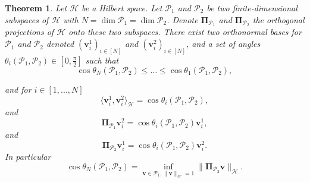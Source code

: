 \documentclass[twoside,11pt]{book}
\newtheorem{theorem}{Theorem}
\numberwithin{theorem}{chapter}
\numberwithin{definition}{chapter}
\numberwithin{proposition}{chapter}
\numberwithin{corollary}{chapter}
\numberwithin{example}{chapter}
\numberwithin{lemma}{chapter}
\numberwithin{assumption}{chapter}
\begin{document}
\begin{theorem}\label{prop:cos_between_subspaces}
Let $\mathcal{H}$ be a Hilbert space. Let $\mathcal{P}_{1}$ and $\mathcal{P}_{2}$ be two finite-dimensional subspaces of $\mathcal{H}$ with $N = \dim \mathcal{P}_{1} = \dim \mathcal{P}_{2}$. Denote $\bm{\Pi}_{\mathcal{P}_{1}}$ and $\bm{\Pi}_{\mathcal{P}_{2}}$ the orthogonal projections of $\mathcal{H}$ onto these two subspaces. There exist two orthonormal bases for $\mathcal{P}_{1}$ and $\mathcal{P}_{2}$ denoted $(\bm{v}_{i}^{1})_{i \in [N]}$ and $(\bm{v}_{i}^{2})_{i \in [N]}$, and a set of angles $\theta_{i}(\mathcal{P}_{1},\mathcal{P}_{2}) \in [0,\frac{\pi}{2}]$ such that
\begin{equation}
\cos \theta_{N}(\mathcal{P}_{1},\mathcal{P}_{2}) \leq \dots \leq \cos \theta_{1}(\mathcal{P}_{1},\mathcal{P}_{2}) ,
\end{equation}

and for $i \in [1,...,N]$
\begin{equation}
\langle \bm{v}_{i}^{1}, \bm{v}_{i}^{2} \rangle_{\mathcal{H}} = \cos \theta_{i}(\mathcal{P}_{1},\mathcal{P}_{2}),
\end{equation}
and
\begin{equation}\label{eq:principal_vectors_projection_relationship}
 \bm{\Pi}_{\mathcal{P}_{1}}\bm{v}_{i}^{2} = \cos \theta_{i}(\mathcal{P}_{1},\mathcal{P}_{2}) \bm{v}_{i}^{1},
\end{equation}
and
\begin{equation}
 \bm{\Pi}_{\mathcal{P}_{2}}\bm{v}_{i}^{1} = \cos \theta_{i}(\mathcal{P}_{1},\mathcal{P}_{2}) \bm{v}_{i}^{2}.
\end{equation}
In particular
\begin{equation}\label{eq:costhetaN}
\cos \theta_{N}(\mathcal{P}_{1},\mathcal{P}_{2}) = \inf\limits_{\bm{v} \in \mathcal{P}_{1},\|\bm{v}\|_{\mathcal{H}} = 1} \|\bm{\Pi}_{\mathcal{P}_{2}}\bm{v}\|_{\mathcal{H}}.
\end{equation}
\end{theorem}
\end{document}
